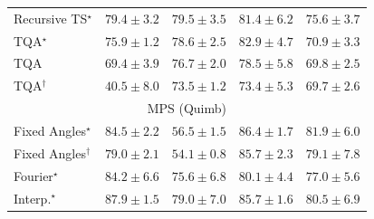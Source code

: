 \begin{tabular}{l|cccc|}
Recursive TS$^\star$ & {\cellcolor[HTML]{873A98}} \color[HTML]{F1F1F1} $79.4\pm 3.2$ & {\cellcolor[HTML]{873897}} \color[HTML]{F1F1F1} $79.5\pm 3.5$ & {\cellcolor[HTML]{852A8E}} \color[HTML]{F1F1F1} $81.4\pm 6.2$ & {\cellcolor[HTML]{8A52A5}} \color[HTML]{F1F1F1} $75.6\pm 3.7$ \\
TQA$^\star$ & {\cellcolor[HTML]{8A51A5}} \color[HTML]{F1F1F1} $75.9\pm 1.2$ & {\cellcolor[HTML]{88409C}} \color[HTML]{F1F1F1} $78.6\pm 2.5$ & {\cellcolor[HTML]{831F86}} \color[HTML]{F1F1F1} $82.9\pm 4.7$ & {\cellcolor[HTML]{8C71B4}} \color[HTML]{F1F1F1} $70.9\pm 3.3$ \\
TQA & {\cellcolor[HTML]{8C7CB9}} \color[HTML]{F1F1F1} $69.4\pm 3.9$ & {\cellcolor[HTML]{894CA2}} \color[HTML]{F1F1F1} $76.7\pm 2.0$ & {\cellcolor[HTML]{88409C}} \color[HTML]{F1F1F1} $78.5\pm 5.8$ & {\cellcolor[HTML]{8C79B8}} \color[HTML]{F1F1F1} $69.8\pm 2.5$ \\
TQA$^\dagger$ & {\cellcolor[HTML]{F2F8FB}} \color[HTML]{000000} $40.5\pm 8.0$ & {\cellcolor[HTML]{8B61AC}} \color[HTML]{F1F1F1} $73.5\pm 1.2$ & {\cellcolor[HTML]{8B61AC}} \color[HTML]{F1F1F1} $73.4\pm 5.3$ & {\cellcolor[HTML]{8C79B8}} \color[HTML]{F1F1F1} $69.7\pm 2.6$ \\
\cline{1-5}
\multicolumn{5}{c}{\rule{0pt}{8pt}MPS (Quimb)} \\
\midrule
Fixed Angles$^\star$ & {\cellcolor[HTML]{9C3604}} \color[HTML]{F1F1F1} $84.5\pm 2.2$ & {\cellcolor[HTML]{FECE65}} \color[HTML]{000000} $56.5\pm 1.5$ & {\cellcolor[HTML]{8E3104}} \color[HTML]{F1F1F1} $86.4\pm 1.7$ & {\cellcolor[HTML]{B13F03}} \color[HTML]{F1F1F1} $81.9\pm 6.0$ \\
Fixed Angles$^\dagger$ & {\cellcolor[HTML]{C84A02}} \color[HTML]{F1F1F1} $79.0\pm 2.1$ & {\cellcolor[HTML]{FEDA7E}} \color[HTML]{000000} $54.1\pm 0.8$ & {\cellcolor[HTML]{933204}} \color[HTML]{F1F1F1} $85.7\pm 2.3$ & {\cellcolor[HTML]{C64902}} \color[HTML]{F1F1F1} $79.1\pm 7.8$ \\
Fourier$^\star$ & {\cellcolor[HTML]{A03704}} \color[HTML]{F1F1F1} $84.2\pm 6.6$ & {\cellcolor[HTML]{D95B09}} \color[HTML]{F1F1F1} $75.6\pm 6.8$ & {\cellcolor[HTML]{BE4503}} \color[HTML]{F1F1F1} $80.1\pm 4.4$ & {\cellcolor[HTML]{D35406}} \color[HTML]{F1F1F1} $77.0\pm 5.6$ \\
Interp.$^\star$ & {\cellcolor[HTML]{832D05}} \color[HTML]{F1F1F1} $87.9\pm 1.5$ & {\cellcolor[HTML]{C84A02}} \color[HTML]{F1F1F1} $79.0\pm 7.0$ & {\cellcolor[HTML]{933204}} \color[HTML]{F1F1F1} $85.7\pm 1.6$ & {\cellcolor[HTML]{BC4503}} \color[HTML]{F1F1F1} $80.5\pm 6.9$ \\

\end{tabular}
